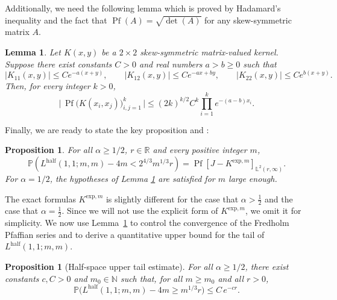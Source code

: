 \documentclass[11pt]{article}
\newtheorem{lemma}[theorem]{Lemma}
\newtheorem{proposition}[theorem]{Proposition}
\theoremstyle{definition}
\newcommand{\R}{\mathbb{R}}
\newcommand{\N}{\mathbb{N}}
\newcommand{\Prob}{\mathbb{P}}
\newcommand{\Lhalf}{L^{\mathrm{half}}}
\begin{document}
Additionally, we need the following lemma \cite[Lemma 2.5]{Pfaffian_Schur} which is proved by Hadamard's inequality and the fact that $\operatorname{Pf}(A) = \sqrt{\det(A)}$ for any skew-symmetric matrix $A$.

\begin{lemma}\label{lemma_pfaffian}
Let \(K(x,y)\) be a \(2\times 2\) skew-symmetric matrix-valued kernel.
Suppose there exist constants \(C>0\) and real numbers \(a>b\ge 0\) such that
\[
|K_{11}(x,y)| \le C e^{-a(x+y)}, \qquad
|K_{12}(x,y)| \le C e^{-a x + b y}, \qquad
|K_{22}(x,y)| \le C e^{b(x+y)}.
\]
Then, for every integer \(k > 0\),
\[
\bigl|\,\operatorname{Pf}\!\big(K(x_i,x_j)\big)_{i,j=1}^k\,\bigr|
\le (2k)^{k/2} C^k \prod_{i=1}^{k} e^{-(a-b)x_i}.
\]
\end{lemma}

Finally, we are ready to state the key proposition \cite[Proposition 1.6]{Pfaffian_Schur} and \cite[Lemma 6.4]{Pfaffian_Schur}:

\begin{proposition}\label{prop:pfaffian_schur}
For all $\alpha \geq 1/2$, $r \in \R$ and every positive integer $m$, 
    \begin{equation}
        \Prob\left(\Lhalf(1,1;m,m) -4m < 2^{4/3}m^{1/3}r\right) = \operatorname{Pf}[J-K^{\text{exp}, m}]_{\mathbb{L}^2(r,\infty)}.
    \end{equation}
For $\alpha = 1/2$, the hypotheses of Lemma \ref{lemma_pfaffian} are satisfied for $m$ large enough.
\end{proposition}

The exact formulas $K^{\text{exp}, m}$ is slightly different for the case that $\alpha > \frac{1}{2}$ and the case that $\alpha=\frac{1}{2}$. Since we will not use the
explicit form of $K^{\mathrm{exp},m}$, we omit it for simplicity. We now use Lemma~\ref{lemma_pfaffian} to control the convergence of the Fredholm Pfaffian series and to derive a quantitative upper bound for the tail of $\Lhalf(1,1;m,m)$.

\begin{proposition}[Half-space upper tail estimate]\label{prop_upper_tail}
For all $\alpha \geq 1/2$, there exist constants $c, C > 0$ and $m_0 \in \N$ such that, for all $m \geq m_0$ and all $r > 0$,
\[
\Prob\big(\Lhalf(1,1;m,m) - 4m \ge m^{1/3} r\big)
\le C \, e^{-c r}.
\]
\end{proposition}
\end{document}
